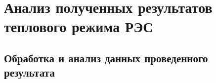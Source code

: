 \section{Анализ полученных результатов теплового режима РЭС}
\subsection{Обработка и анализ данных проведенного результата}